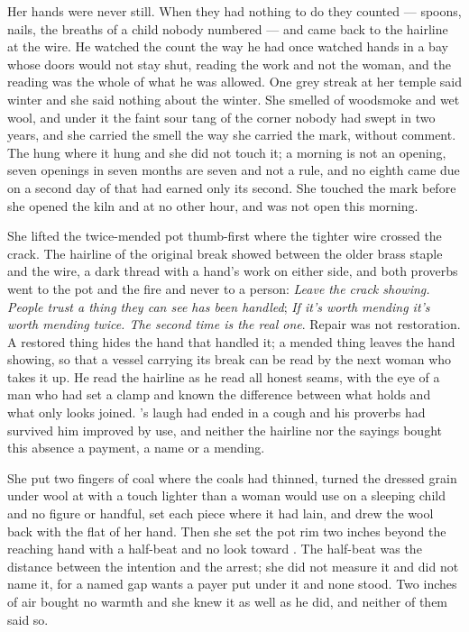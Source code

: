Her hands were never still. When they had nothing to do they counted --- spoons, nails, the breaths of a child nobody numbered --- and came back to the hairline at the wire. He watched the count the way he had once watched hands in a bay whose doors would not stay shut, reading the work and not the woman, and the reading was the whole of what he was allowed. One grey streak at her temple said winter and she said nothing about the winter. She smelled of woodsmoke and wet wool, and under it the faint sour tang of the corner nobody had swept in two years, and she carried the smell the way she carried the mark, without comment. The  hung where it hung and she did not touch it; a morning is not an opening, seven openings in seven months are seven and not a rule, and no eighth came due on a second day of  that had earned only its second. She touched the mark before she opened the kiln and at no other hour, and  was not open this morning.

She lifted the twice-mended pot thumb-first where the tighter wire crossed the crack. The hairline of the original break showed between the older brass staple and the wire, a dark thread with a hand's work on either side, and both proverbs went to the pot and the fire and never to a person: \emph{Leave the crack showing. People trust a thing they can see has been handled}; \emph{If it's worth mending it's worth mending twice. The second time is the real one}. Repair was not restoration. A restored thing hides the hand that handled it; a mended thing leaves the hand showing, so that a vessel carrying its break can be read by the next woman who takes it up. He read the hairline as he read all honest seams, with the eye of a man who had set a clamp and known the difference between what holds and what only looks joined. 's laugh had ended in a cough and his proverbs had survived him improved by use, and neither the hairline nor the sayings bought this absence a payment, a name or a mending.

She put two fingers of coal where the coals had thinned, turned the dressed grain under wool at  with a touch lighter than a woman would use on a sleeping child and no figure or handful, set each piece where it had lain, and drew the wool back with the flat of her hand. Then she set the pot rim two inches beyond the reaching hand with a half-beat and no look toward . The half-beat was the distance between the intention and the arrest; she did not measure it and did not name it, for a named gap wants a payer put under it and none stood. Two inches of air bought no warmth and she knew it as well as he did, and neither of them said so.

